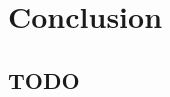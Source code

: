 \documentclass[onehalf,11pt]{beavtex}
\begin{document}


\chapter{Conclusion}
\section{TODO}


{}

\end{document}
